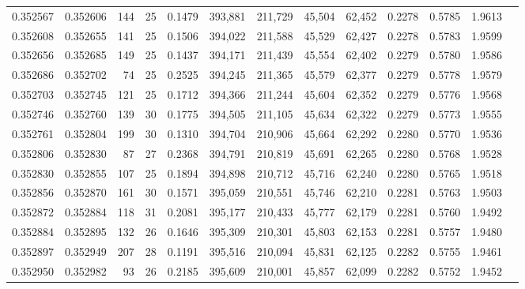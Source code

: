 \begin{tabular}{rrrrrrrrrrrrr}
0.352567 & 0.352606 &   144 &  25 &                                     0.1479 & 393,881 & 211,729 &  45,504 &  62,452 & 0.2278 & 0.5785 & 1.9613 \\
0.352608 & 0.352655 &   141 &  25 &                                     0.1506 & 394,022 & 211,588 &  45,529 &  62,427 & 0.2278 & 0.5783 & 1.9599 \\
0.352656 & 0.352685 &   149 &  25 &                                     0.1437 & 394,171 & 211,439 &  45,554 &  62,402 & 0.2279 & 0.5780 & 1.9586 \\
0.352686 & 0.352702 &    74 &  25 &                                     0.2525 & 394,245 & 211,365 &  45,579 &  62,377 & 0.2279 & 0.5778 & 1.9579 \\
0.352703 & 0.352745 &   121 &  25 &                                     0.1712 & 394,366 & 211,244 &  45,604 &  62,352 & 0.2279 & 0.5776 & 1.9568 \\
0.352746 & 0.352760 &   139 &  30 &                                     0.1775 & 394,505 & 211,105 &  45,634 &  62,322 & 0.2279 & 0.5773 & 1.9555 \\
0.352761 & 0.352804 &   199 &  30 &                                     0.1310 & 394,704 & 210,906 &  45,664 &  62,292 & 0.2280 & 0.5770 & 1.9536 \\
0.352806 & 0.352830 &    87 &  27 &                                     0.2368 & 394,791 & 210,819 &  45,691 &  62,265 & 0.2280 & 0.5768 & 1.9528 \\
0.352830 & 0.352855 &   107 &  25 &                                     0.1894 & 394,898 & 210,712 &  45,716 &  62,240 & 0.2280 & 0.5765 & 1.9518 \\
0.352856 & 0.352870 &   161 &  30 &                                     0.1571 & 395,059 & 210,551 &  45,746 &  62,210 & 0.2281 & 0.5763 & 1.9503 \\
0.352872 & 0.352884 &   118 &  31 &                                     0.2081 & 395,177 & 210,433 &  45,777 &  62,179 & 0.2281 & 0.5760 & 1.9492 \\
0.352884 & 0.352895 &   132 &  26 &                                     0.1646 & 395,309 & 210,301 &  45,803 &  62,153 & 0.2281 & 0.5757 & 1.9480 \\
0.352897 & 0.352949 &   207 &  28 &                                     0.1191 & 395,516 & 210,094 &  45,831 &  62,125 & 0.2282 & 0.5755 & 1.9461 \\
0.352950 & 0.352982 &    93 &  26 &                                     0.2185 & 395,609 & 210,001 &  45,857 &  62,099 & 0.2282 & 0.5752 & 1.9452 \\

\end{tabular}
